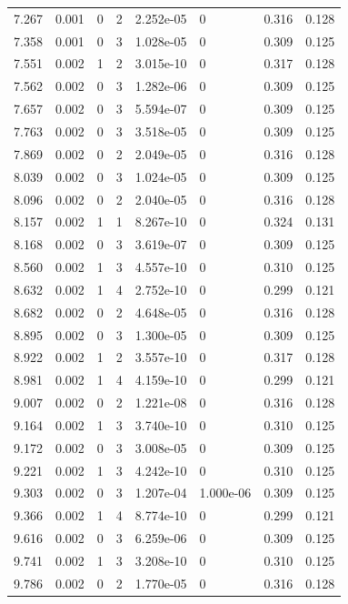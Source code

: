 \documentclass[preview]{standalone}
\begin{document}
{{{\begin{tabular}{L{1.2cm}C{1.2cm} C{0.3cm}C{0.5cm} C{1.4cm}C{1.4cm} C{1.4cm}C{1.4cm}}
  7.267  &  0.001  & 0     &  2 &  2.252e-05  & 0  & 0.316 &  0.128   \\ 
  7.358  &  0.001  & 0     &  3 &  1.028e-05  & 0  & 0.309 &  0.125   \\ 
  7.551  &  0.002  & 1     &  2 &  3.015e-10  & 0  & 0.317 &  0.128   \\ 
  7.562  &  0.002  & 0     &  3 &  1.282e-06  & 0  & 0.309 &  0.125   \\ 
  7.657  &  0.002  & 0     &  3 &  5.594e-07  & 0  & 0.309 &  0.125   \\ 
  7.763  &  0.002  & 0     &  3 &  3.518e-05  & 0  & 0.309 &  0.125   \\ 
  7.869  &  0.002  & 0     &  2 &  2.049e-05  & 0  & 0.316 &  0.128   \\ 
  8.039  &  0.002  & 0     &  3 &  1.024e-05  & 0  & 0.309 &  0.125   \\ 
  8.096  &  0.002  & 0     &  2 &  2.040e-05  & 0  & 0.316 &  0.128   \\ 
  8.157  &  0.002  & 1     &  1 &  8.267e-10  & 0  & 0.324 &  0.131   \\ 
  8.168  &  0.002  & 0     &  3 &  3.619e-07  & 0  & 0.309 &  0.125   \\ 
  8.560  &  0.002  & 1     &  3 &  4.557e-10  & 0  & 0.310 &  0.125   \\ 
  8.632  &  0.002  & 1     &  4 &  2.752e-10  & 0  & 0.299 &  0.121   \\ 
  8.682  &  0.002  & 0     &  2 &  4.648e-05  & 0  & 0.316 &  0.128   \\ 
  8.895  &  0.002  & 0     &  3 &  1.300e-05  & 0  & 0.309 &  0.125   \\ 
  8.922  &  0.002  & 1     &  2 &  3.557e-10  & 0  & 0.317 &  0.128   \\ 
  8.981  &  0.002  & 1     &  4 &  4.159e-10  & 0  & 0.299 &  0.121   \\ 
  9.007  &  0.002  & 0     &  2 &  1.221e-08  & 0  & 0.316 &  0.128   \\ 
  9.164  &  0.002  & 1     &  3 &  3.740e-10  & 0  & 0.310 &  0.125   \\ 
  9.172  &  0.002  & 0     &  3 &  3.008e-05  & 0  & 0.309 &  0.125   \\ 
  9.221  &  0.002  & 1     &  3 &  4.242e-10  & 0  & 0.310 &  0.125   \\ 
  9.303  &  0.002  & 0     &  3 &  1.207e-04  & 1.000e-06  & 0.309 &  0.125   \\ 
  9.366  &  0.002  & 1     &  4 &  8.774e-10  & 0  & 0.299 &  0.121   \\ 
  9.616  &  0.002  & 0     &  3 &  6.259e-06  & 0  & 0.309 &  0.125   \\ 
  9.741  &  0.002  & 1     &  3 &  3.208e-10  & 0  & 0.310 &  0.125   \\ 
  9.786  &  0.002  & 0     &  2 &  1.770e-05  & 0  & 0.316 &  0.128   \\ 
\hline 
\end{tabular} 

}}}
\end{document}
